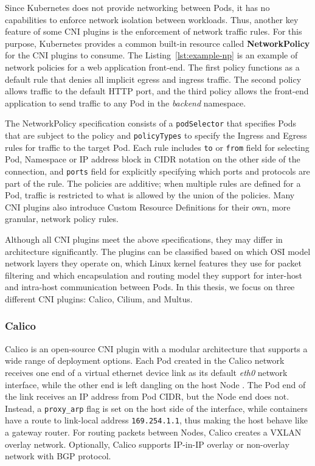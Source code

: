 \documentclass[english, 12pt, a4paper, sci, utf8, a-2b, online]{aaltothesis}
\begin{document}
Since Kubernetes does not provide networking between Pods, it has no capabilities to enforce network isolation between workloads.
Thus, another key feature of some CNI plugins is the enforcement of network traffic rules.
For this purpose, Kubernetes provides a common built-in resource called \textbf{NetworkPolicy} for the CNI plugins to consume.
The Listing~\ref{lst:example-np} is an example of network policies for a web application front-end.
The first policy functions as a default rule that denies all implicit egress and ingress traffic.
The second policy allows traffic to the default HTTP port, and the third policy allows the front-end application to send traffic to any Pod in the \emph{backend} namespace.



The NetworkPolicy specification consists of a \lstinline{podSelector} that specifies Pods that are subject to the policy and \lstinline{policyTypes} to specify the Ingress and Egress rules for traffic \cite{budigiri2021network} to the target Pod.
Each rule includes \lstinline{to} or \lstinline{from} field for selecting Pod, Namespace or IP address block in CIDR notation on the other side of the connection, and \lstinline{ports} field for explicitly specifying which ports and protocols are part of the rule.
The policies are additive; when multiple rules are defined for a Pod, traffic is restricted to what is allowed by the union of the policies.
Many CNI plugins also introduce Custom Resource Definitions for their own, more granular, network policy rules.

Although all CNI plugins meet the above specifications, they may differ in architecture significantly.
The plugins can be classified based on which OSI model network layers they operate on, which Linux kernel features they use for packet filtering and which encapsulation and routing model they support for inter-host and intra-host communication between Pods.
In this thesis, we focus on three different CNI plugins: Calico, Cilium, and Multus.

\subsubsection{Calico}

Calico \cite{calico} is an open-source CNI plugin with a modular architecture that supports a wide range of deployment options.
Each Pod created in the Calico network receives one end of a virtual ethernet device link as its default \emph{eth0} network interface, while the other end is left dangling on the host Node \cite{calico-tkng}.
The Pod end of the link receives an IP address from Pod CIDR, but the Node end does not.
Instead, a \lstinline{proxy_arp} flag is set on the host side of the interface, while containers have a route to link-local address \lstinline{169.254.1.1}, thus making the host behave like a gateway router.
For routing packets between Nodes, Calico creates a VXLAN overlay network.
Optionally, Calico supports IP-in-IP overlay or non-overlay network with BGP protocol.
\end{document}
